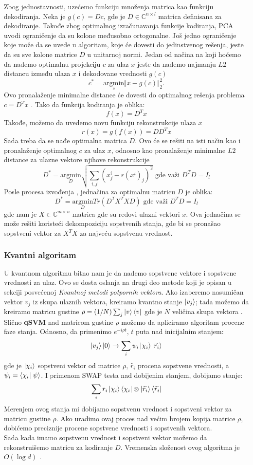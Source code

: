 \documentclass[12pt, letterpaper, oneside]{article}
\begin{document}
Zbog jednostavnosti, uzećemo funkciju množenja matrica kao funkciju dekodiranja. Neka je $g(c)=Dc$, gde je
$D \in \mathbb{C}^{n \times l}$ matrica definisana za dekodiranje. Takođe zbog optimalnog izračunavanja funkcije kodiranja, 
PCA uvodi ograničenje da su kolone međusobno ortogonalne. Još jedno ograničenje koje može da se uvede u algoritam,
koje će dovesti do jedinstvenog rešenja, jeste da su sve kolone matrice $D$ u unitarnoj normi.
Jedan od načina na koji hoćemo da nađemo optimalnu projekciju $c$ za ulaz $x$ jeste da nađemo najmanju $L2$ distancu između ulaza $x$ i dekodovane vrednosti $g(c)$
\[
  c^{*} = \underset{c}{\mathrm{argmin}} \Vert x-g(c) \Vert_2^2.
\]
Ovo pronalaženje minimalne distance će dovesti do optimalnog rešenja problema $c=D^{T}x$ \cite{goodfellow2016deep}. Tako da funkcija kodiranja je oblika:
\[
f(x) = D^T x
\]
Takođe, možemo da uvedemo novu funkciju rekonstrukcije ulaza $x$
\[
  r(x) = g(f(x)) = DD^T x
\]
Sada treba da se nađe optimalna matrica $D$. Ovo će se rešiti na isti način kao i pronalaženje optimalnog $c$ za ulaz $x$, odnosno kao pronalaženje minimalne $L2$ distance za ulazne vektore
njihove rekonstrukcije
\[
    D^{*} =\underset{D}{\mathrm{argmin}} \sqrt{\sum_{i,j}(x^i_j - r(x^i)_j)^2} \text{ gde važi } D^TD = I_l
\]
Posle procesa izvođenja \cite{goodfellow2016deep}, jednačina za optimalnu matricu $D$ je oblika:
\[
    D^{*} =\underset{D}{\mathrm{argmin}}  Tr(D^TX^TXD) \text{ gde važi } D^TD = I_l
\] 
gde nam je $X \in \mathbb{C}^{m \times n}$ matrica gde su redovi ulazni vektori $x$. Ova jednačina se može rešiti koristeći dekompoziciju sopstvenih stanja,
gde bi se pronašao sopstveni vektor za $X^TX$ za najveću sopstvenu vrednost. 
\subsubsection{Kvantni algoritam}
U kvantnom algoritmu bitno nam je da nađemo sopstvene vektore i sopstvene vrednosti za ulaz. Ovo se dosta oslanja na drugi deo metode koji je opisan u sekciji posvećenoj \textit{Kvantnoj metodi potpornih vektora}.
Ako izaberemo nasumičan vektor $v_j$ iz skupa ulaznih vektora, kreiramo kvantno stanje $\Ket{v_j}$; tada možemo da kreiramo matricu gustine $\rho = (1/N)\sum_j\Ket{v}\Bra{v}$ gde je $N$ veličina skupa vektora \cite{Quantum_machine_learning}.
Slično \textbf{qSVM} nad matricom gustine $\rho$ možemo da apliciramo algoritam procene faze stanja. Odnosno, da primenimo $e^{-i \rho t}$, $t$ puta nad inicijalnim stanjem:
\[
    \Ket{v_j}\Ket{0} \to \sum_i \psi_i\Ket{\chi_i}\Ket{\widetilde{r_i}}
\] 
gde je $\Ket{\chi_i}$ sopstveni vektor od matrice $\rho$, $\widetilde{r_i}$ procena sopstvene vrednosti, a $\psi_i = \Braket{\chi_i|\psi}$.
I primenom SWAP testa nad dobijenim stanjem, dobijamo stanje:
\[
    \sum_i r_i \Ket{\chi_i}\Bra{\chi_i}\otimes \Ket{\widetilde{r_i}}\Bra{\widetilde{r_i}}
\]
Merenjem ovog stanja mi dobijamo sopstvenu vrednost i sopstveni vektor za matricu gustine $\rho$. Ako uradimo ovaj proces nad većim brojem kopija matrice $\rho$, dobićemo preciznije procene sopstvene vrednosti i sopstvenih vektora. \\
Sada kada imamo sopstvenu vrednost i sopstveni vektor možemo da rekonstruišemo matricu za kodiranje $D$. Vremenska složenost ovog algoritma je $O(\log d)$ \cite{Lloyd_2014}.
\end{document}
